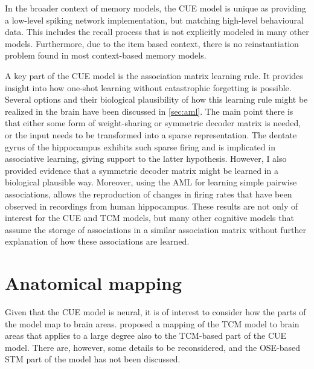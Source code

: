 In the broader context of memory models, the CUE model is unique as providing a low-level spiking network implementation, but matching high-level behavioural data.
This includes the recall process that is not explicitly modeled in many other models.
Furthermore, due to the item based context, there is no reinstantiation problem found in most context-based memory models.

A key part of the CUE model is the association matrix learning rule.
It provides insight into how one-shot learning without catastrophic forgetting is possible.
Several options and their biological plausibility of how this learning rule might be realized in the brain have been discussed in \cref{sec:aml}.
The main point there is that either some form of weight-sharing or symmetric decoder matrix is needed, or the input needs to be transformed into a sparse representation.
The dentate gyrus of the hippocampus exhibits such sparse firing and is implicated in associative learning, giving support to the latter hypothesis.
However, I also provided evidence that a symmetric decoder matrix might be learned in a biological plausible way.
Moreover, using the AML for learning simple pairwise associations, allows the reproduction of changes in firing rates that have been observed in recordings from human hippocampus.
These results are not only of interest for the CUE and TCM models, but many other cognitive models that assume the storage of associations in a similar association matrix without further explanation of how these associations are learned.




\section{Anatomical mapping}

Given that the CUE model is neural, it is of interest to consider how the parts of the model map to brain areas.
\Textcite{howard2005} proposed a mapping of the TCM model to brain areas that applies to a large degree also to the TCM-based part of the CUE model.
There are, however, some details to be reconsidered, and the OSE-based STM part of the model has not been discussed.

